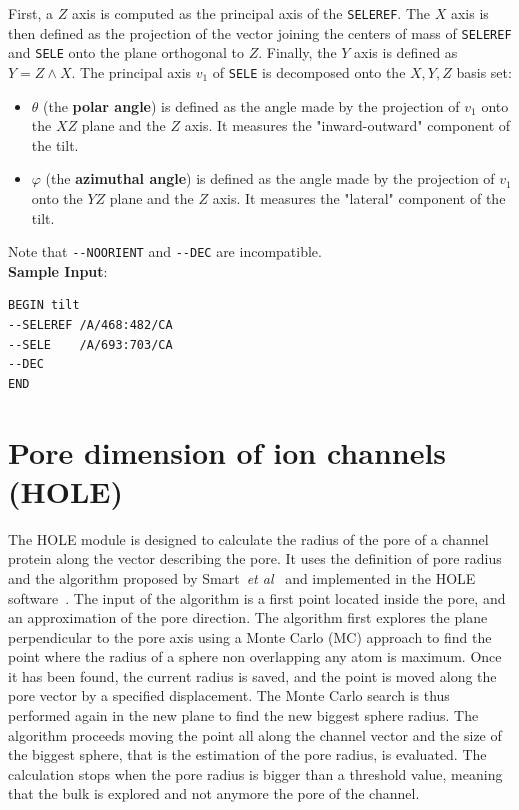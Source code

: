 \documentclass[11pt,twoside,onecolumn,a4paper,openright,notitlepage]{book}[2001/04/21]
\begin{document}
First, a $Z$ axis is computed as the principal axis of the \verb!SELEREF!. The $X$ axis is then defined as the projection of the vector joining the centers of mass of \verb!SELEREF! and \verb!SELE! onto the plane orthogonal to $Z$. Finally, the $Y$ axis is defined as $Y = Z \wedge X$. The principal axis $v_1$ of \verb!SELE! is decomposed onto the $X,Y,Z$ basis set:
\begin{itemize}
\item $\theta$ (the \textbf{polar angle}) is defined as the angle made by the projection of $v_1$ onto the $XZ$ plane and the $Z$ axis. It measures the "inward-outward" component of the tilt. 
\item $\varphi$ (the \textbf{azimuthal angle}) is defined as the angle made by the projection of $v_1$ onto the $YZ$ plane and the $Z$ axis. It measures the "lateral" component of the tilt.
\end{itemize}
Note that \verb!--NOORIENT! and \verb!--DEC! are incompatible.\\


\textbf{\large Sample Input}:

\begin{verbatim}
BEGIN tilt
--SELEREF /A/468:482/CA
--SELE    /A/693:703/CA
--DEC
END

\end{verbatim}


\clearpage
\section{Pore dimension of ion channels (HOLE)}

The HOLE module is designed to calculate the radius of the pore of a channel protein along the vector describing the pore. It uses the definition of pore radius and the algorithm proposed by Smart~\textit{et al}~\cite{smart1993pore} and implemented in the HOLE software~\cite{smart1996hole}. The input of the algorithm is a first point located inside the pore, and an approximation of the pore direction. The algorithm first explores the plane perpendicular to the pore axis using a Monte Carlo (MC) approach to find the point where the radius of a sphere non overlapping any atom is maximum. Once it has been found, the current radius is saved, and the point is moved along the pore vector by a specified displacement. The Monte Carlo search is thus performed again in the new plane to find the new biggest sphere radius. The algorithm proceeds moving the point all along the channel vector and the size of the biggest sphere, that is the estimation of the pore radius, is evaluated. The calculation stops when the pore radius is bigger than a threshold value, meaning that the bulk is explored and not anymore the pore of the channel.
\end{document}
